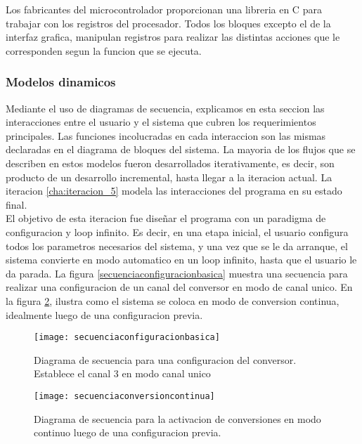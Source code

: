 
Los fabricantes del microcontrolador proporcionan una libreria en C para trabajar con los registros del procesador. Todos los bloques excepto el de la interfaz grafica, manipulan registros para realizar las distintas acciones que le corresponden segun la funcion que se ejecuta.  


\subsubsection{Modelos dinamicos} %
\label{it2:subsub:modelos_dinamicos}

Mediante el uso de diagramas de secuencia, explicamos en esta seccion las interacciones entre el usuario y el sistema que cubren los requerimientos principales. Las funciones incolucradas en cada interaccion son las mismas declaradas en el diagrama de bloques del sistema. La mayoria de los flujos que se describen en estos modelos fueron desarrollados iterativamente, es decir, son producto de un desarrollo incremental, hasta llegar a la iteracion actual. La iteracion \ref{cha:iteracion_5} modela las interacciones del programa en su estado final. \\

El objetivo de esta iteracion fue diseñar el programa con un paradigma de configuracion y loop infinito. Es decir, en una etapa inicial, el usuario configura todos los parametros necesarios del sistema, y una vez que se le da arranque, el sistema convierte en modo automatico en un loop infinito, hasta que el usuario le da parada. La figura \ref{secuenciaconfiguracionbasica} muestra una secuencia para realizar una configuracion de un canal del conversor en modo de canal unico. En la figura \ref{fig:secuenciaconversioncontinua}, ilustra como el sistema se coloca en modo de conversion continua, idealmente luego de una configuracion previa. 

\begin{figure}[h]
  \centering
  \texttt{[image: secuenciaconfiguracionbasica]}
  \caption{Diagrama de secuencia para una configuracion del conversor. Establece el canal 3 en modo canal unico}\label{fig:secuenciaconfiguracionbasica}
\end{figure}

\begin{figure}[h]
  \centering
  \texttt{[image: secuenciaconversioncontinua]}
  \caption{Diagrama de secuencia para la activacion de conversiones en modo continuo luego de una configuracion previa.}\label{fig:secuenciaconversioncontinua}
\end{figure}


